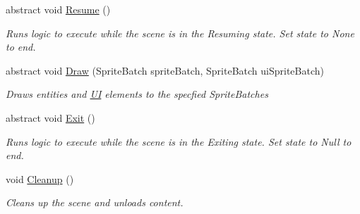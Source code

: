 \begin{DoxyCompactItemize}
abstract void \hyperlink{class_m_b2_d_1_1_scenes_1_1_scene_ad13639db22b059a1b714eefd9d927735}{Resume} ()
\begin{DoxyCompactList}\small\item\em Runs logic to execute while the scene is in the Resuming state. Set state to None to end. \end{DoxyCompactList}\item 
abstract void \hyperlink{class_m_b2_d_1_1_scenes_1_1_scene_a932d33071ecb4c5187367825dba72324}{Draw} (Sprite\+Batch sprite\+Batch, Sprite\+Batch ui\+Sprite\+Batch)
\begin{DoxyCompactList}\small\item\em Draws entities and \hyperlink{namespace_m_b2_d_1_1_u_i}{UI} elements to the specfied Sprite\+Batches \end{DoxyCompactList}\item 
abstract void \hyperlink{class_m_b2_d_1_1_scenes_1_1_scene_a099b79e16d23b67349847999d2336813}{Exit} ()
\begin{DoxyCompactList}\small\item\em Runs logic to execute while the scene is in the Exiting state. Set state to Null to end. \end{DoxyCompactList}\item 
void \hyperlink{class_m_b2_d_1_1_scenes_1_1_scene_a3ee3777b94ccff0a739e75ca1ca151c6}{Cleanup} ()
\begin{DoxyCompactList}\small\item\em Cleans up the scene and unloads content. \end{DoxyCompactList}\end{DoxyCompactItemize}
